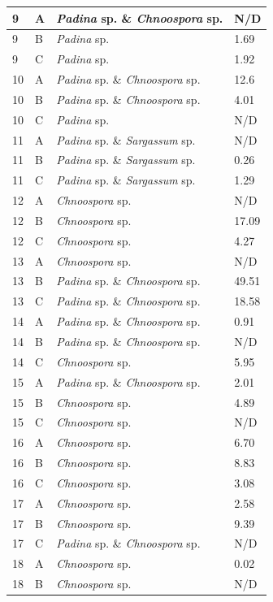 \documentclass[12pt]{article}
\begin{document}
\begin{longtable}{ | p{2cm} | p{2cm} | p{3cm} | p{3.5cm} |}
\\
\hline
9&A&\emph{Padina} sp. \& \emph{Chnoospora} sp.&N/D\\
\hline
9&B&\emph{Padina} sp.&1.69
\\
\hline
9&C&\emph{Padina} sp.&1.92
\\
\hline
10&A&\emph{Padina} sp. \& \emph{Chnoospora} sp.&12.6
\\
\hline
10&B&\emph{Padina} sp. \& \emph{Chnoospora} sp.&4.01
\\
\hline
10&C&\emph{Padina} sp.&N/D\\
\hline
11 
&A&
\emph{Padina} sp. \& \emph{Sargassum} sp.&N/D\\
\hline
11 
&B&\emph{Padina} sp. \& \emph{Sargassum} sp.&0.26\\
\hline
11 
&C&\emph{Padina} sp. \& \emph{Sargassum} sp.&1.29\\
\hline
12&A&\emph{Chnoospora} sp.&N/D\\
\hline
12&B&\emph{Chnoospora} sp.&17.09
\\
\hline
12&C&\emph{Chnoospora} sp.&4.27
\\
\hline
13&A&\emph{Chnoospora} sp.&N/D\\
\hline
13&B&\emph{Padina} sp. \& \emph{Chnoospora} sp.&49.51
\\
\hline
13&C&\emph{Padina} sp. \& \emph{Chnoospora} sp.&18.58
\\
\hline
14&A&\emph{Padina} sp. \& \emph{Chnoospora} sp.&0.91
\\
\hline
14&B&\emph{Padina} sp. \& \emph{Chnoospora} sp.&N/D\\
\hline
14&C&\emph{Chnoospora} sp.&5.95
\\
\hline
15&A&\emph{Padina} sp. \& \emph{Chnoospora} sp.&2.01
\\
\hline
15&B&\emph{Chnoospora} sp.&4.89
\\
\hline
15&C&\emph{Chnoospora} sp.&N/D\\
\hline
16&A&\emph{Chnoospora} sp.&6.70\\
\hline
16&B&\emph{Chnoospora} sp.&8.83
\\
\hline
16&C&\emph{Chnoospora} sp.&3.08
\\
\hline
17&A&\emph{Chnoospora} sp.&2.58
\\
\hline
17&B&\emph{Chnoospora} sp.&9.39
\\
\hline
17&C&\emph{Padina} sp. \& \emph{Chnoospora} sp.&N/D\\
\hline
18&A&\emph{Chnoospora }sp.&0.02
\\
\hline
18&B&\emph{Chnoospora} sp.&N/D\\

\end{longtable}
\end{document}
